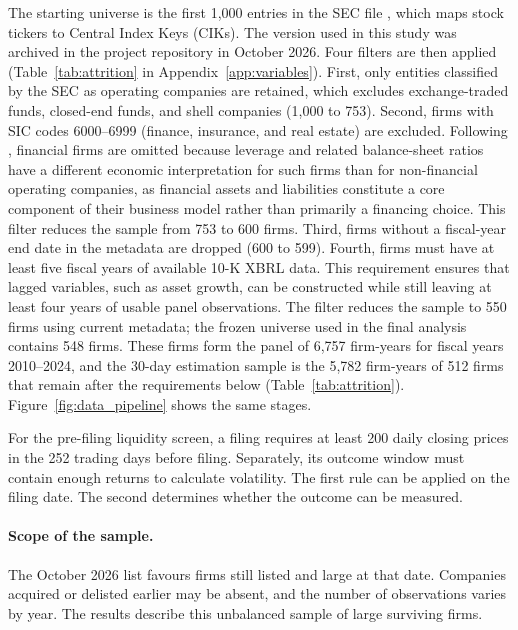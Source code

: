 The starting universe is the first 1{,}000 entries in the SEC file
, which maps stock tickers to Central Index Keys
(CIKs). The version used in this study was archived in the project repository
in October 2026. Four filters are then applied (Table~\ref{tab:attrition} in
Appendix~\ref{app:variables}). First, only entities classified by the SEC as
operating companies are retained, which excludes exchange-traded funds,
closed-end funds, and shell companies (1{,}000 to 753). Second, firms with SIC
codes 6000--6999 (finance, insurance, and real estate) are excluded. Following
\textcite{fama1992}, financial firms are omitted because leverage and related
balance-sheet ratios have a different economic interpretation for such firms
than for non-financial operating companies, as financial assets and
liabilities constitute a core component of their business model rather than
primarily a financing choice. This filter reduces the sample from 753 to 600
firms. Third, firms without a fiscal-year end date in the metadata are
dropped (600 to 599). Fourth, firms must have at least five fiscal years of
available 10-K XBRL data. This requirement ensures that lagged variables, such
as asset growth, can be constructed while still leaving at least four years of
usable panel observations. The filter reduces the sample to 550 firms using
current metadata; the frozen universe used in the final analysis contains 548
firms. These firms form the panel of 6{,}757 firm-years for fiscal years
2010--2024, and the 30-day estimation sample is the 5{,}782 firm-years of 512
firms that remain after the requirements below (Table~\ref{tab:attrition}).
Figure~\ref{fig:data_pipeline} shows the same stages.

For the pre-filing liquidity screen, a filing requires at least 200 daily closing prices in the 252 trading days before filing. Separately, its outcome window must contain enough returns to calculate volatility. The first rule can be applied on the filing date. The second determines whether the outcome can be measured.

\paragraph{Scope of the sample.} The October 2026 list favours firms still listed and large at that date. Companies acquired or delisted earlier may be absent, and the number of observations varies by year. The results describe this unbalanced sample of large surviving firms.

